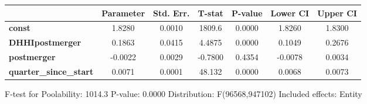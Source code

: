 \documentclass{report}
\begin{document}
\begin{center}
\begin{tabular}{lcccccc}
                               & \textbf{Parameter} & \textbf{Std. Err.} & \textbf{T-stat} & \textbf{P-value} & \textbf{Lower CI} & \textbf{Upper CI}  \\
\midrule
\textbf{const}                 &       1.8280       &       0.0010       &      1809.6     &      0.0000      &       1.8260      &       1.8300       \\
\textbf{DHHIpostmerger}        &       0.1863       &       0.0415       &      4.4875     &      0.0000      &       0.1049      &       0.2676       \\
\textbf{postmerger}            &      -0.0022       &       0.0029       &     -0.7800     &      0.4354      &      -0.0078      &       0.0034       \\
\textbf{quarter\_since\_start} &       0.0071       &       0.0001       &      48.132     &      0.0000      &       0.0068      &       0.0073       \\
\bottomrule
\end{tabular}
\end{center}

F-test for Poolability: 1014.3 \newline
 P-value: 0.0000 \newline
 Distribution: F(96568,947102) \newline
  \newline
 Included effects: Entity
\end{document}
